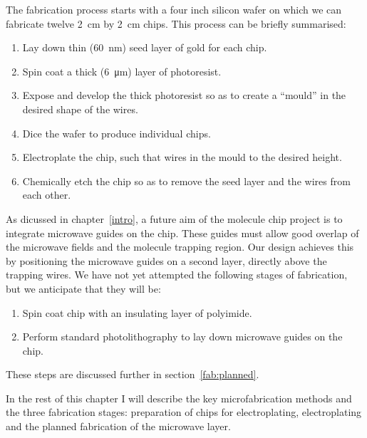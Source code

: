 The fabrication process starts with a four inch silicon wafer on which we can
fabricate twelve \SI{2}{\centi\meter} by \SI{2}{\centi\meter}  chips. This
process can be briefly summarised:
\begin{enumerate}
\item Lay down thin (\SI{60}{\nano\meter}) seed layer of gold for each chip.
\item Spin coat a thick (\SI{6}{\micro\meter}) layer of photoresist.
\item Expose and develop the thick photoresist so as to create a ``mould''
in the desired shape of the wires.
\item Dice the wafer to produce individual chips.
\item Electroplate the chip, such that wires  in the mould to the
desired height.
\item Chemically etch the chip so as to remove the seed layer and
   the wires from each other.
\end{enumerate}


As dicussed in chapter~\ref{intro}, a future aim of the molecule chip project is to
integrate microwave guides on the chip. These guides must allow good overlap of
the microwave fields and the molecule trapping region. Our design achieves this
by positioning the microwave guides on a second layer, directly above the
trapping wires. We have not yet attempted the following stages of
fabrication, but we anticipate that they will be:
\begin{enumerate}[resume]
    \item Spin coat chip with an insulating layer of polyimide.
    \item Perform standard photolithography to lay down microwave guides on the
      chip.
\end{enumerate}
These steps are discussed further in section~\ref{fab:planned}.

In the rest of this chapter I will describe the key microfabrication methods
and the three fabrication stages: preparation of chips for electroplating,
electroplating and the planned fabrication of the microwave layer.

